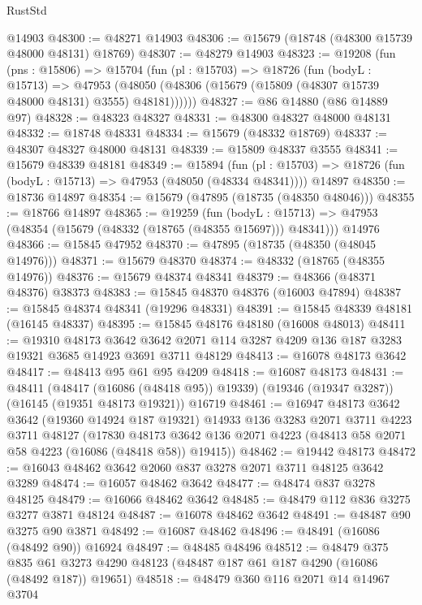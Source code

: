 \begin{lexlean}{RustStd}
\begin{coremodule}
    @14903
@48300 := @48271 @14903
@48306 := @15679 (@18748 (@48300 @15739 @48000 @48131) @18769)
@48307 := @48279 @14903
@48323 := @19208
    (fun (pns : @15806) =>
    @15704
      (fun (pl : @15703) =>
      @18726
        (fun (bodyL : @15713) =>
        @47953 (@48050 (@48306 (@15679 (@15809 (@48307 @15739 @48000 @48131) @3555) @48181))))))
@48327 := @86 @14880 (@86 @14889 @97)
@48328 := @48323 @48327
@48331 := @48300 @48327 @48000 @48131
@48332 := @18748 @48331
@48334 := @15679 (@48332 @18769)
@48337 := @48307 @48327 @48000 @48131
@48339 := @15809 @48337 @3555
@48341 := @15679 @48339 @48181
@48349 := @15894
    (fun (pl : @15703) => @18726 (fun (bodyL : @15713) => @47953 (@48050 (@48334 @48341))))
    @14897
@48350 := @18736 @14897
@48354 := @15679 (@47895 (@18735 (@48350 @48046)))
@48355 := @18766 @14897
@48365 := @19259
    (fun (bodyL : @15713) => @47953 (@48354 (@15679 (@48332 (@18765 (@48355 @15697))) @48341)))
    @14976
@48366 := @15845 @47952
@48370 := @47895 (@18735 (@48350 (@48045 @14976)))
@48371 := @15679 @48370
@48374 := @48332 (@18765 (@48355 @14976))
@48376 := @15679 @48374 @48341
@48379 := @48366 (@48371 @48376) @38373
@48383 := @15845 @48370 @48376 (@16003 @47894)
@48387 := @15845 @48374 @48341 (@19296 @48331)
@48391 := @15845 @48339 @48181 (@16145 @48337)
@48395 := @15845 @48176 @48180 (@16008 @48013)
@48411 := @19310
    @48173
    @3642
    @3642
    @2071
    @114
    @3287
    @4209
    @136
    @187
    @3283
    @19321
    @3685
    @14923
    @3691
    @3711
    @48129
@48413 := @16078 @48173 @3642
@48417 := @48413 @95 @61 @95 @4209
@48418 := @16087 @48173
@48431 := @48411
    (@48417 (@16086 (@48418 @95)) @19339)
    (@19346 (@19347 @3287))
    (@16145 (@19351 @48173 @19321))
    @16719
@48461 := @16947
    @48173
    @3642
    @3642
    (@19360 @14924 @187 @19321)
    @14933
    @136
    @3283
    @2071
    @3711
    @4223
    @3711
    @48127
    (@17830 @48173 @3642 @136 @2071 @4223 (@48413 @58 @2071 @58 @4223 (@16086 (@48418 @58)) @19415))
@48462 := @19442 @48173
@48472 := @16043 @48462 @3642 @2060 @837 @3278 @2071 @3711 @48125 @3642 @3289
@48474 := @16057 @48462 @3642
@48477 := @48474 @837 @3278 @48125
@48479 := @16066 @48462 @3642
@48485 := @48479 @112 @836 @3275 @3277 @3871 @48124
@48487 := @16078 @48462 @3642
@48491 := @48487 @90 @3275 @90 @3871
@48492 := @16087 @48462
@48496 := @48491 (@16086 (@48492 @90)) @16924
@48497 := @48485 @48496
@48512 := @48479
    @375
    @835
    @61
    @3273
    @4290
    @48123
    (@48487 @187 @61 @187 @4290 (@16086 (@48492 @187)) @19651)
@48518 := @48479 @360 @116 @2071 @14 @14967 @3704

\end{coremodule}
\end{lexlean}
